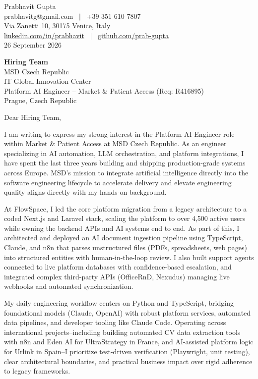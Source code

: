 \documentclass[11pt,a4paper]{article}
\begin{document}
Prabhavit Gupta\\
prabhavitg@gmail.com ~$\vert$~ +39 351 610 7807\\
Via Zanetti 10, 30175 Venice, Italy\\
\href{https://www.linkedin.com/in/prabhavit/}{linkedin.com/in/prabhavit} ~$\vert$~ \href{https://github.com/prab-gupta}{github.com/prab-gupta}\\
26 September 2026

\textbf{Hiring Team}\\
MSD Czech Republic\\
IT Global Innovation Center\\
Platform AI Engineer -- Market \& Patient Access (Req: R416895)\\
Prague, Czech Republic

Dear Hiring Team,

I am writing to express my strong interest in the Platform AI Engineer role within Market \& Patient Access at MSD Czech Republic. As an engineer specializing in AI automation, LLM orchestration, and platform integrations, I have spent the last three years building and shipping production-grade systems across Europe. MSD's mission to integrate artificial intelligence directly into the software engineering lifecycle to accelerate delivery and elevate engineering quality aligns directly with my hands-on background.

At FlowSpace, I led the core platform migration from a legacy architecture to a coded Next.js and Laravel stack, scaling the platform to over 4,500 active users while owning the backend APIs and AI systems end to end. As part of this, I architected and deployed an AI document ingestion pipeline using TypeScript, Claude, and n8n that parses unstructured files (PDFs, spreadsheets, web pages) into structured entities with human-in-the-loop review. I also built support agents connected to live platform databases with confidence-based escalation, and integrated complex third-party APIs (OfficeRnD, Nexudus) managing live webhooks and automated synchronization.

My daily engineering workflow centers on Python and TypeScript, bridging foundational models (Claude, OpenAI) with robust platform services, automated data pipelines, and developer tooling like Claude Code. Operating across international projects--including building automated CV data extraction tools with n8n and Eden AI for UltraStrategy in France, and AI-assisted platform logic for Urlink in Spain--I prioritize test-driven verification (Playwright, unit testing), clear architectural boundaries, and practical business impact over rigid adherence to legacy frameworks.
\end{document}
